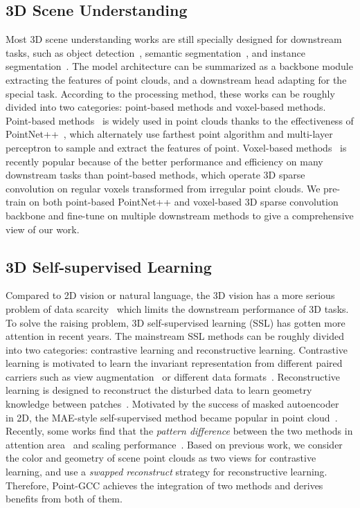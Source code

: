 \documentclass{article}
\begin{document}
\subsection{3D Scene Understanding}
\vspace{-0.25cm}
Most 3D scene understanding works are still specially designed for downstream tasks, such as object detection~\cite{VoteNet, GroupFree, FCAF3D, TR3D, ThreeDETR}, semantic segmentation~\cite{SL3D, WYPR, MPRM, PointNet++}, and instance segmentation~\cite{TD3D, PointGroup, SoftGroup, HAIS}. The model architecture can be summarized as a backbone module extracting the features of point clouds, and a downstream head adapting for the special task. According to the processing method, these works can be roughly divided into two categories: point-based methods and voxel-based methods. Point-based methods~\cite{VoteNet, GroupFree,SL3D} is widely used in point clouds thanks to the effectiveness of PointNet++~\citep{PointNet++}, which alternately use farthest point algorithm and multi-layer perceptron to sample and extract the features of point. Voxel-based methods~\cite{FCAF3D, TR3D,TD3D, PointGroup, SoftGroup, HAIS} is recently popular because of the better performance and efficiency on many downstream tasks than point-based methods, which operate 3D sparse convolution on regular voxels transformed from irregular point clouds. We pre-train on both point-based PointNet++ and voxel-based 3D sparse convolution backbone and fine-tune on multiple downstream methods to give a comprehensive view of our work.

\subsection{3D Self-supervised Learning}
\vspace{-0.25cm}
Compared to 2D vision or natural language, the 3D vision has a more serious problem of data scarcity~\citep{ACT23} which limits the downstream performance of 3D tasks. To solve the raising problem, 3D self-supervised learning (SSL) has gotten more attention in recent years. The mainstream SSL methods can be roughly divided into two categories: contrastive learning and reconstructive learning. Contrastive learning is motivated to learn the invariant representation from different paired carriers such as view augmentation~\citep{SimCLR, PointContrast} or different data formats~\citep{CLIP, ULIP22}. Reconstructive learning is designed to reconstruct the disturbed data to learn geometry knowledge between patches~\citep{BERT, BEiT}. Motivated by the success of masked autoencoder~\citep{MAE} in 2D, the MAE-style self-supervised method became popular in point cloud~\citep{PointMAE, PointM2AE22}. Recently, some works find that the \textit{pattern difference} between the two methods 
 in attention area~\citep{DarkMIM22} and scaling performance~\citep{recon23}. 
Based on previous work, we consider the color and geometry of scene point clouds as two views for contrastive learning, and use a \textit{swapped reconstruct} strategy for reconstructive learning. Therefore, Point-GCC achieves the integration of two methods and derives benefits from both of them.
\end{document}
